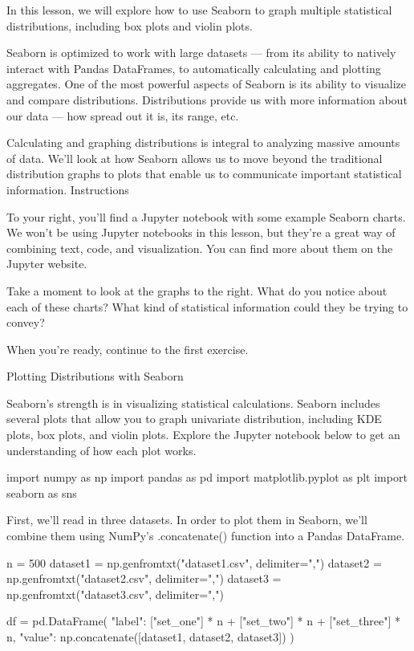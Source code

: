 \documentclass{journal}
\begin{document}
In this lesson, we will explore how to use Seaborn to graph multiple statistical distributions, including box plots and violin plots.

Seaborn is optimized to work with large datasets — from its ability to natively interact with Pandas DataFrames, to automatically calculating and plotting aggregates. One of the most powerful aspects of Seaborn is its ability to visualize and compare distributions. Distributions provide us with more information about our data — how spread out it is, its range, etc.

Calculating and graphing distributions is integral to analyzing massive amounts of data. We’ll look at how Seaborn allows us to move beyond the traditional distribution graphs to plots that enable us to communicate important statistical information.
Instructions

To your right, you’ll find a Jupyter notebook with some example Seaborn charts. We won’t be using Jupyter notebooks in this lesson, but they’re a great way of combining text, code, and visualization. You can find more about them on the Jupyter website.

Take a moment to look at the graphs to the right. What do you notice about each of these charts? What kind of statistical information could they be trying to convey?

When you’re ready, continue to the first exercise.




Plotting Distributions with Seaborn

Seaborn's strength is in visualizing statistical calculations. Seaborn includes several plots that allow you to graph univariate distribution, including KDE plots, box plots, and violin plots. Explore the Jupyter notebook below to get an understanding of how each plot works.

import numpy as np
import pandas as pd
import matplotlib.pyplot as plt
import seaborn as sns

First, we'll read in three datasets. In order to plot them in Seaborn, we'll combine them using NumPy's .concatenate() function into a Pandas DataFrame.

n = 500
dataset1 = np.genfromtxt("dataset1.csv", delimiter=",")
dataset2 = np.genfromtxt("dataset2.csv", delimiter=",")
dataset3 = np.genfromtxt("dataset3.csv", delimiter=",")


df = pd.DataFrame({
    "label": ["set_one"] * n + ["set_two"] * n + ["set_three"] * n,
    "value": np.concatenate([dataset1, dataset2, dataset3])
})
\end{document}
